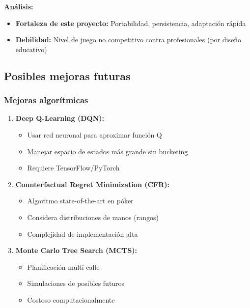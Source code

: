 \documentclass[12pt,a4paper]{article}
\begin{document}
\textbf{Análisis:}
\begin{itemize}
    \item \textbf{Fortaleza de este proyecto:} Portabilidad, persistencia, adaptación rápida
    \item \textbf{Debilidad:} Nivel de juego no competitivo contra profesionales (por diseño educativo)
\end{itemize}

\subsection{Posibles mejoras futuras}

\subsubsection{Mejoras algorítmicas}

\begin{enumerate}
    \item \textbf{Deep Q-Learning (DQN):}
    \begin{itemize}
        \item Usar red neuronal para aproximar función Q
        \item Manejar espacio de estados más grande sin bucketing
        \item Requiere TensorFlow/PyTorch
    \end{itemize}
    
    \item \textbf{Counterfactual Regret Minimization (CFR):}
    \begin{itemize}
        \item Algoritmo state-of-the-art en póker
        \item Considera distribuciones de manos (rangos)
        \item Complejidad de implementación alta
    \end{itemize}
    
    \item \textbf{Monte Carlo Tree Search (MCTS):}
    \begin{itemize}
        \item Planificación multi-calle
        \item Simulaciones de posibles futuros
        \item Costoso computacionalmente
    \end{itemize}
\end{enumerate}
\end{document}
